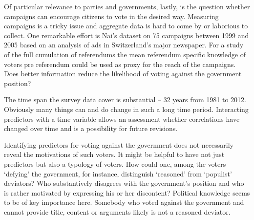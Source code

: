\documentclass[11pt,a4paper]{article}\usepackage[]{graphicx}\usepackage[]{color}
\begin{document}
    
    Of particular relevance to parties and governments, lastly, is the question whether campaigns can encourage citizens to vote in the desired way. Measuring campaigns is a tricky issue and aggregate data is hard to come by or laborious to collect. One remarkable effort is Nai's \citeyear{nai)_choisir_2013} dataset on 75 campaigns between 1999 and 2005 based on an analysis of ads in Switzerland's major newspaper. For a study of the full cumulation of referendums the mean referendum specific knowledge of voters pre referendum could be used as proxy for the reach of the campaigns. Does better information reduce the likelihood of voting against the government position?
    
    The time span the survey data cover is substantial -- 32 years from 1981 to 2012. Obviously many things can and do change in such a long time period. Interacting predictors with a time variable allows an assessment whether correlations have changed over time and is a possibility for future revisions.
    
    Identifying predictors for voting against the government does not necessarily reveal the motivations of such voters. It might be helpful to have not just predictors but also a typology of voters. How could one, among the voters `defying' the government, for instance, distinguish `reasoned' from `populist' deviators?  Who substantively disagrees with the government's position and who is rather motivated by expressing his or her discontent? Political knowledge seems to be of key importance here. Somebody who voted against the government and cannot provide title, content or arguments likely is not a reasoned deviator. %
    
    
\end{document}
